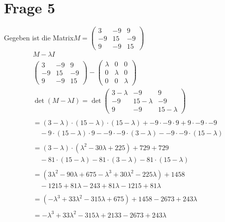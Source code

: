 \section{Frage 5}

Gegeben ist die Matrix$M = \begin{pmatrix}
    3 & -9 & 9 \\
    -9 & 15 & -9 \\
    9 & -9 & 15
\end{pmatrix}$
\begin{align*}
    M - \lambda I \\
    \begin{pmatrix}
    3 & -9 & 9 \\
    -9 & 15 & -9 \\
    9 & -9 & 15
\end{pmatrix} - \begin{pmatrix}
    \lambda & 0 & 0 \\
    0 & \lambda & 0 \\
    0 & 0 & \lambda
\end{pmatrix} \\
\det(M - \lambda I) = \det\begin{pmatrix}
    3 - \lambda & -9 & 9 \\
    -9 & 15 - \lambda & -9 \\
    9 & -9 & 15 - \lambda
\end{pmatrix} \\
\\
= (3 - \lambda) \cdot (15 - \lambda) \cdot (15 - \lambda) + -9 \cdot -9 \cdot 9 + 9 \cdot -9 \cdot -9 \\
\quad - 9 \cdot (15 - \lambda) \cdot 9 - -9 \cdot -9 \cdot (3 - \lambda) - -9 \cdot -9 \cdot (15 - \lambda) \\
\\
= (3 - \lambda) \cdot (\lambda^2 - 30\lambda + 225) + 729 + 729 \\
\quad - 81 \cdot (15 - \lambda) - 81 \cdot (3 - \lambda) - 81 \cdot (15 - \lambda) \\
\\
= (3\lambda^2 - 90\lambda + 675 - \lambda^3 + 30\lambda^2 - 225\lambda) + 1458 \\
\quad - 1215 + 81\lambda - 243 + 81\lambda - 1215 + 81\lambda \\
\\
= (-\lambda^3 + 33\lambda^2 - 315\lambda + 675) + 1458 - 2673 + 243\lambda \\
\\
= -\lambda^3 + 33\lambda^2 - 315\lambda + 2133 - 2673 + 243\lambda \\

\end{align*}
